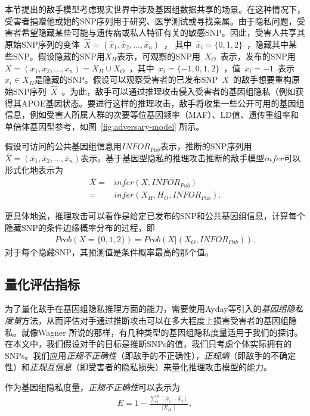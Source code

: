本节提出的敌手模型考虑现实世界中涉及基因组数据共享的场景。在这种情况下，受害者捐赠他或她的SNP序列用于研究、医学测试或寻找亲属。由于隐私问题，受害者希望隐藏某些可能与遗传病或私人特征有关的敏感SNP。因此，受害人共享其原始SNP序列的变体~$\hat{X}=(\hat{x}_1,\hat{x}_2, ... , \hat{x}_n)$~， 其中~$\hat{x}_i =\{0,1,2\}$~，隐藏其中某些SNP。假设隐藏的SNP用$X_H$表示，可观察的SNP用~$X_O$~表示，发布的SNP用~$X=(x_1, x_2, ..., x_n)=X_H \cup X_O$~，其中~$x_i =\{-1,0,1,2\}$~，值~$x_i=-1$~表示$x_i\in X_H$是隐藏的SNP。假设可以观察受害者的已发布SNP~$X$~的敌手想要重构原始SNP序列~$\hat{X}$~。为此，敌手可以通过推理攻击侵入受害者的基因组隐私（例如获得其APOE基因状态\cite{nyholt_jim_2009}。要进行这样的推理攻击，敌手将收集一些公开可用的基因组信息\cite{IGSR_2019,IMPUTE2_Howie_2014}，例如受害人所属人群的次要等位基因频率（MAF）、LD值、遗传重组率和单倍体基因型参考，如图~\ref{fig:adversary-model} 所示。

假设可访问的公共基因组信息用${INFOR}_{Pub}$表示，推断的SNP序列用$\bar{X}=(\bar{x}_1, \bar{x}_2,...,\bar{x}_n)$表示。基于基因型隐私的推理攻击推断的敌手模型$infer$可以形式化地表示为
\begin{align}\label{eq:adversary-model}
\bar{X} =& infer(X,{INFOR}_{Pub})  \nonumber \\
= & infer(X_H,H_O,{INFOR}_{Pub}).
\end{align}

更具体地说，推理攻击可以看作是给定已发布的SNP和公共基因组信息，计算每个隐藏SNP的条件边缘概率分布的过程，即
\begin{align}\label{eq:adversary-model-prob}
Prob(X=\{0,1,2\})=Prob(X|(X_O,{INFOR}_{Pub})).
\end{align}
对于每个隐藏SNP，其预测值是条件概率最高的那个值。
\subsection{量化评估指标}


为了量化敌手在基因组隐私推理方面的能力，需要使用Ayday等\cite{ayday2013personal}引入的\textit{基因组隐私度量}方法，从而评估对手通过推断攻击可以在多大程度上损害受害者的基因组隐私。就像Wagner
\cite{wagner2017evaluating}
所说的那样，有几种类型的基因组隐私度量适用于我们的探讨。在本文中，我们假设对手的目标是推断SNPs的值，我们只考虑个体实际拥有的SNPs。我们应用\textit{正规不正确性}（即敌手的不正确性），\textit{正规熵}（即敌手的不确定性）和\textit{正规互信息}（即受害者的隐私损失）来量化推理攻击模型的能力。

作为基因组隐私度量，\textit{正规不正确性}可以表示为
\begin{align}\label{eq:metric-correctness}
E=1- \frac{\sum_1^n \mid \bar{x}_j - \hat{x}_j \mid}  {\mid X_H \mid},
\end{align}

